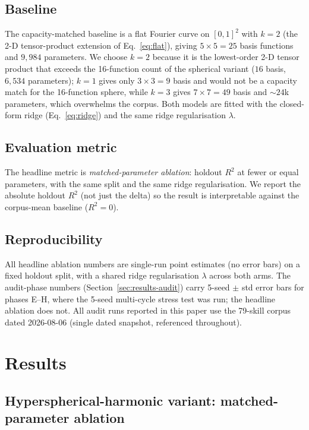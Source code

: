\documentclass[11pt,a4paper]{article}
\theoremstyle{plain}
\theoremstyle{remark}
\theoremstyle{plain}
\begin{document}
\subsection{Baseline}

The capacity-matched baseline is a flat Fourier curve on $[0,1]^2$ with $k=2$ (the 2-D tensor-product extension of Eq.~\ref{eq:flat}), giving $5 \times 5 = 25$ basis functions and $9{,}984$ parameters. We choose $k=2$ because it is the lowest-order 2-D tensor product that exceeds the 16-function count of the spherical variant ($16$ basis, $6{,}534$ parameters); $k=1$ gives only $3 \times 3 = 9$ basis and would not be a capacity match for the 16-function sphere, while $k=3$ gives $7 \times 7 = 49$ basis and $\sim 24$k parameters, which overwhelms the corpus. Both models are fitted with the closed-form ridge (Eq.~\ref{eq:ridge}) and the same ridge regularisation $\lambda$.

\subsection{Evaluation metric}

The headline metric is \emph{matched-parameter ablation}: holdout $R^2$ at fewer or equal parameters, with the same split and the same ridge regularisation. We report the absolute holdout $R^2$ (not just the delta) so the result is interpretable against the corpus-mean baseline ($R^2 = 0$).

\subsection{Reproducibility}

All headline ablation numbers are single-run point estimates (no error bars) on a fixed holdout split, with a shared ridge regularisation $\lambda$ across both arms. The audit-phase numbers (Section~\ref{sec:results-audit}) carry 5-seed $\pm$ std error bars for phases E--H, where the 5-seed multi-cycle stress test was run; the headline ablation does not. All audit runs reported in this paper use the 79-skill corpus dated 2026-08-06 (single dated snapshot, referenced throughout).

\section{Results}
\label{sec:results}

\subsection{Hyperspherical-harmonic variant: matched-parameter ablation}
\label{sec:results-ablation}
\end{document}
